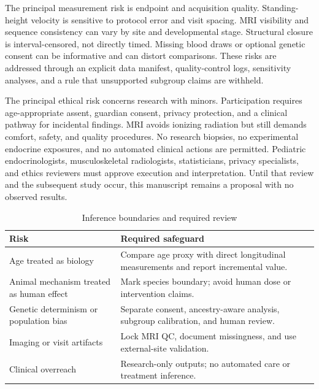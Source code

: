 \documentclass[conference]{IEEEtran}
\begin{document}
The principal measurement risk is endpoint and acquisition quality. Standing-height velocity is sensitive to protocol error and visit spacing. MRI visibility and sequence consistency can vary by site and developmental stage. Structural closure is interval-censored, not directly timed. Missing blood draws or optional genetic consent can be informative and can distort comparisons. These risks are addressed through an explicit data manifest, quality-control logs, sensitivity analyses, and a rule that unsupported subgroup claims are withheld.

The principal ethical risk concerns research with minors. Participation requires age-appropriate assent, guardian consent, privacy protection, and a clinical pathway for incidental findings. MRI avoids ionizing radiation but still demands comfort, safety, and quality procedures. No research biopsies, no experimental endocrine exposures, and no automated clinical actions are permitted. Pediatric endocrinologists, musculoskeletal radiologists, statisticians, privacy specialists, and ethics reviewers must approve execution and interpretation. Until that review and the subsequent study occur, this manuscript remains a proposal with no observed results.

\begin{table}[t]
\caption{Inference boundaries and required review}
\label{tab:risks}
\centering
\footnotesize
\begin{tabular}{p{}p{}}
\toprule
Risk & Required safeguard \\
\midrule
Age treated as biology & Compare age proxy with direct longitudinal measurements and report incremental value. \\
Animal mechanism treated as human effect & Mark species boundary; avoid human dose or intervention claims. \\
Genetic determinism or population bias & Separate consent, ancestry-aware analysis, subgroup calibration, and human review. \\
Imaging or visit artifacts & Lock MRI QC, document missingness, and use external-site validation. \\
Clinical overreach & Research-only outputs; no automated care or treatment inference. \\
\bottomrule
\end{tabular}
\end{table}
\end{document}
